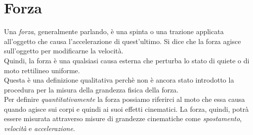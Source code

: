 \documentclass[12pt]{report}
\begin{document}
	\section{Forza}
	Una \textit{forza}, generalmente parlando, è  una spinta o una trazione applicata all'oggetto che causa l'accelerazione di quest'ultimo. Si dice che la forza agisce sull'oggetto per modificarne la velocità. \\
	Quindi, la forza è  una qualsiasi causa esterna che perturba lo stato di quiete o di moto rettilineo uniforme.
	\\ Questa è  una definizione qualitativa perchè  non è  ancora stato introdotto la procedura per la misura della grandezza fisica della forza. \\
	Per definire \textit{quantitativamente} la forza possiamo riferirci al moto che essa causa quando agisce sui corpi e quindi ai suoi effetti cinematici. La forza, quindi, potrà essere misurata attraverso misure di grandezze cinematiche come \textit{spostamento}, \textit{velocità} e \textit{accelerazione}.
\end{document}
